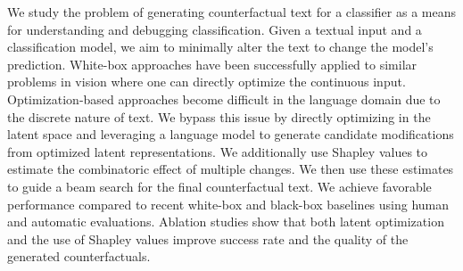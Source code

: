 We study the problem of generating counterfactual text for a classifier as a means for understanding and debugging classification. Given a textual input and a classification model, we aim to minimally alter the text to change the model's prediction. White-box approaches have been successfully applied to similar problems in vision where one can directly optimize the continuous input. Optimization-based approaches become difficult in the language domain due to the discrete nature of text. We bypass this issue by directly optimizing in the latent space and leveraging a language model to generate candidate modifications from optimized latent representations. We additionally use Shapley values to estimate the combinatoric effect of multiple changes. We then use these estimates to guide a beam search for the final counterfactual text. We achieve favorable performance compared to recent white-box and black-box baselines using human and automatic evaluations. Ablation studies show that both latent optimization and the use of Shapley values improve success rate and the quality of the generated counterfactuals.
